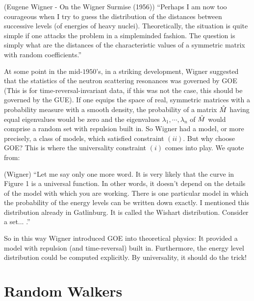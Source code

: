 \begin{sic}
	(Eugene Wigner - On the Wigner Surmise (1956))
	“Perhaps I am now too courageous when I try to guess the distribution of the distances between successive levels (of energies of heavy nuclei). Theoretically, the situation is quite simple if one attacks the problem in a simpleminded fashion. The question is simply what are the distances of the characteristic values of a symmetric matrix with random coefficients.” 
\end{sic}

At some point in the mid-$1950$’s, in a striking development, Wigner suggested that the statistics of the neutron scattering resonances was governed by GOE (This is for time-reversal-invariant data, if this was not the case, this should be governed by the GUE). If one equips the space of real, symmetric matrices with a probability measure with a smooth density, the probability of a matrix $\hat M$ having equal eigenvalues would be zero and the eigenvalues $\lambda_1, \cdots , \lambda_n$ of $\hat M$ would comprise a random set with repulsion built in. So Wigner had a model, or more precisely, a class of models, which satisfied constraint $(ii)$. But why choose GOE? This is where the universality constraint $(i)$ comes into play. We quote from:
\begin{citation}
	(Wigner)
	“Let me say only one more word. It is very likely that the curve in Figure 1 is a universal function. In other words, it doesn’t depend on the details of the model with which you are working. There is one particular model in which the probability of the energy levels can be written down exactly. I mentioned this distribution already in Gatlinburg. It is called the Wishart distribution. Consider a set... .” 
\end{citation}
So in this way Wigner introduced GOE into theoretical physics: It provided a model with repulsion (and time-reversal) built in. Furthermore, the energy level distribution could be computed explicitly. By universality, it should do the trick! 

\section{Random Walkers}

